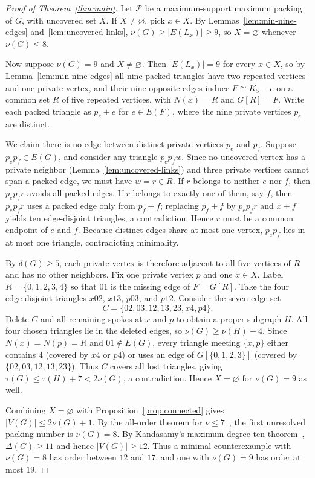 \documentclass[11pt]{article}
\begin{document}
\begin{proof}[Proof of Theorem~\ref{thm:main}]
Let $\mathcal{P}$ be a maximum-support maximum packing of $G$, with uncovered set $X$. If $X\neq\varnothing$, pick $x\in X$. By Lemmas~\ref{lem:min-nine-edges} and~\ref{lem:uncovered-links}, $\nu(G)\geq |E(L_x)|\geq 9$, so $X=\varnothing$ whenever $\nu(G)\leq 8$.

Now suppose $\nu(G)=9$ and $X\neq\varnothing$. Then $|E(L_x)|=9$ for every $x\in X$, so by Lemma~\ref{lem:min-nine-edges} all nine packed triangles have two repeated vertices and one private vertex, and their nine opposite edges induce $F\cong K_5-e$ on a common set $R$ of five repeated vertices, with $N(x)=R$ and $G[R]=F$. Write each packed triangle as $p_e+e$ for $e\in E(F)$, where the nine private vertices $p_e$ are distinct.

We claim there is no edge between distinct private vertices $p_e$ and $p_f$. Suppose $p_ep_f\in E(G)$, and consider any triangle $p_ep_fw$. Since no uncovered vertex has a private neighbor (Lemma~\ref{lem:uncovered-links}) and three private vertices cannot span a packed edge, we must have $w=r\in R$. If $r$ belongs to neither $e$ nor $f$, then $p_ep_fr$ avoids all packed edges. If $r$ belongs to exactly one of them, say $f$, then $p_ep_fr$ uses a packed edge only from $p_f+f$; replacing $p_f+f$ by $p_ep_fr$ and $x+f$ yields ten edge-disjoint triangles, a contradiction. Hence $r$ must be a common endpoint of $e$ and $f$. Because distinct edges share at most one vertex, $p_ep_f$ lies in at most one triangle, contradicting minimality.

By $\delta(G)\geq 5$, each private vertex is therefore adjacent to all five vertices of $R$ and has no other neighbors. Fix one private vertex $p$ and one $x\in X$. Label $R=\{0,1,2,3,4\}$ so that $01$ is the missing edge of $F=G[R]$. Take the four edge-disjoint triangles $x02$, $x13$, $p03$, and $p12$. Consider the seven-edge set
\[
C=\{02,03,12,13,23,x4,p4\}.
\]
Delete $C$ and all remaining spokes at $x$ and $p$ to obtain a proper subgraph $H$. All four chosen triangles lie in the deleted edges, so $\nu(G)\geq\nu(H)+4$. Since $N(x)=N(p)=R$ and $01\notin E(G)$, every triangle meeting $\{x,p\}$ either contains $4$ (covered by $x4$ or $p4$) or uses an edge of $G[\{0,1,2,3\}]$ (covered by $\{02,03,12,13,23\}$). Thus $C$ covers all lost triangles, giving $\tau(G)\leq\tau(H)+7<2\nu(G)$, a contradiction. Hence $X=\varnothing$ for $\nu(G)=9$ as well.

Combining $X=\varnothing$ with Proposition~\ref{prop:connected} gives $|V(G)|\leq 2\nu(G)+1$. By the all-order theorem for $\nu\leq 7$~\cite{PackingSeven}, the first unresolved packing number is $\nu(G)=8$. By Kandasamy's maximum-degree-ten theorem~\cite{Kandasamy}, $\Delta(G)\geq 11$ and hence $|V(G)|\geq 12$. Thus a minimal counterexample with $\nu(G)=8$ has order between $12$ and $17$, and one with $\nu(G)=9$ has order at most $19$.
\end{proof}
\end{document}
